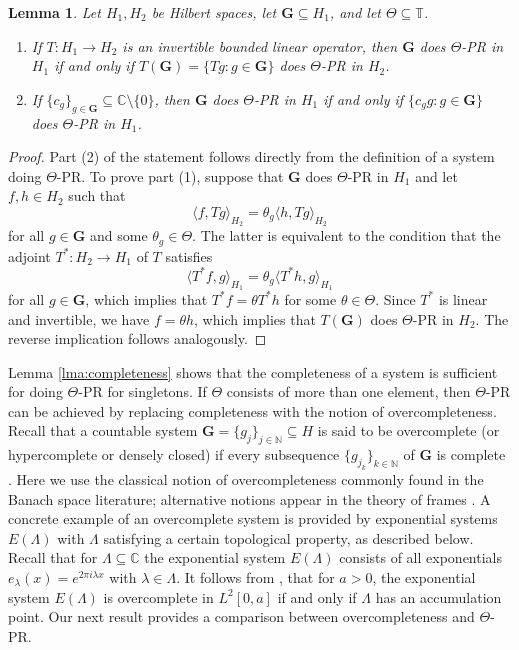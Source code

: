 \documentclass[reqno,a4paper,11pt]{amsart}
\numberwithin{equation}{section}
\newtheorem{lemma}[definition]{Lemma}
\def\N{{\mathbb N}}
\def\T{{\mathbb T}}
\def\C{{\mathbb C}}
\newcommand\1{\mathds{1}}
\begin{document}
\begin{lemma}\label{lemma:invariantTransform}
Let $H_1,H_2$ be Hilbert spaces, let $\mathbf{G} \subseteq H_1$, and let $\Theta \subseteq \T$.
    \begin{enumerate}
        \item If $T : H_1 \to H_2$ is an invertible bounded linear operator, then $\mathbf{G}$ does $\Theta$-PR in $H_1$ if and only if $T(\mathbf{G}) = \{ Tg : g \in \mathbf{G} \}$ does $\Theta$-PR in $H_2$.
        \item If $\{ c_g \}_{g \in \mathbf{G}} \subseteq \C \setminus \{ 0 \}$, then $\mathbf{G}$ does $\Theta$-PR in $H_1$ if and only if $\{ c_gg : g \in \mathbf{G} \}$ does $\Theta$-PR in $H_1$.
    \end{enumerate}
\end{lemma}
\begin{proof}
    Part (2) of the statement follows directly from the definition of a system doing $\Theta$-PR. To prove part (1), suppose that $\mathbf{G}$ does $\Theta$-PR in $H_1$ and let $f,h \in H_2$ such that
    $$
    \langle f,Tg \rangle_{H_2} = \theta_g \langle h,Tg \rangle_{H_2}
    $$
    for all $g \in \mathbf{G}$ and some $\theta_g \in \Theta$. The latter is equivalent to the condition that the adjoint $T^* : H_2 \to H_1$ of $T$ satisfies
    $$
    \langle T^*f,g \rangle_{H_1} = \theta_g \langle T^*h,g \rangle_{H_1}
    $$
    for all $g \in \mathbf{G}$, which implies that $T^* f = \theta T^* h$ for some $\theta \in \Theta$. Since $T^*$ is linear and invertible, we have $f= \theta h$, which implies that $T(\mathbf{G})$ does $\Theta$-PR in $H_2$. The reverse implication follows analogously.
\end{proof}

Lemma \ref{lma:completeness} shows that the completeness of a system is sufficient for doing $\Theta$-PR for singletons. If $\Theta$ consists of more than one element, then $\Theta$-PR can be achieved by replacing completeness with the notion of overcompleteness. Recall that a countable system $\mathbf{G} = \{ g_j \}_{j\in \N} \subseteq H$ is said to be overcomplete (or hypercomplete or densely closed) if every subsequence $\{ g_{j_k} \}_{k\in\N}$ of $\mathbf{G}$ is complete \cite{singer1981bases}. Here we use the classical notion of overcompleteness commonly found in the Banach space literature; alternative notions appear in the theory of frames \cite{christensen2003introduction,heil2011basis}. A concrete example of an overcomplete system is provided by exponential systems $E(\Lambda)$ with $\Lambda$ satisfying a certain topological property, as described below. Recall that for $\Lambda \subseteq \C$ the exponential system $E(\Lambda)$ consists of all exponentials $e_\lambda(x) = e^{2\pi i \lambda x}$ with $\lambda \in \Lambda$. It follows from \cite[Theorem 4.3]{chalendar2006overcompleteness}, that for $a>0$, the exponential system $E(\Lambda)$ is overcomplete in $L^2[0,a]$ if and only if $\Lambda$ has an accumulation point.
Our next result provides a comparison between overcompleteness and $\Theta$-PR.
\end{document}
